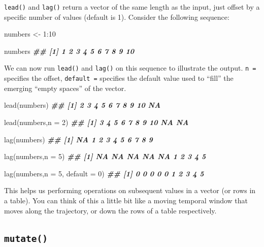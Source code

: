 \documentclass[
]{book}
\newenvironment{Shaded}{\begin{snugshade}}{\end{snugshade}}
\newcommand{\AttributeTok}[1]{\textcolor[rgb]{0.77,0.63,0.00}{#1}}
\newcommand{\DecValTok}[1]{\textcolor[rgb]{0.00,0.00,0.81}{#1}}
\newcommand{\DocumentationTok}[1]{\textcolor[rgb]{0.56,0.35,0.01}{\textbf{\textit{#1}}}}
\newcommand{\FunctionTok}[1]{\textcolor[rgb]{0.00,0.00,0.00}{#1}}
\newcommand{\NormalTok}[1]{#1}
\newcommand{\OtherTok}[1]{\textcolor[rgb]{0.56,0.35,0.01}{#1}}
\newcommand{\SpecialCharTok}[1]{\textcolor[rgb]{0.00,0.00,0.00}{#1}}
\begin{document}
\texttt{lead()} and \texttt{lag()} return a vector of the same length as the input, just offset by a specific number of values (default is 1). Consider the following sequence:

\begin{Shaded}
\begin{Highlighting}[]
\NormalTok{numbers }\OtherTok{\textless{}{-}} \DecValTok{1}\SpecialCharTok{:}\DecValTok{10}

\NormalTok{numbers}
\DocumentationTok{\#\#  [1]  1  2  3  4  5  6  7  8  9 10}
\end{Highlighting}
\end{Shaded}

We can now run \texttt{lead()} and \texttt{lag()} on this sequence to illustrate the output. \texttt{n\ =} specifies the offset, \texttt{default\ =} specifies the default value used to ``fill'' the emerging ``empty spaces'' of the vector.

\begin{Shaded}
\begin{Highlighting}[]
\FunctionTok{lead}\NormalTok{(numbers)}
\DocumentationTok{\#\#  [1]  2  3  4  5  6  7  8  9 10 NA}

\FunctionTok{lead}\NormalTok{(numbers,}\AttributeTok{n =} \DecValTok{2}\NormalTok{)}
\DocumentationTok{\#\#  [1]  3  4  5  6  7  8  9 10 NA NA}

\FunctionTok{lag}\NormalTok{(numbers)}
\DocumentationTok{\#\#  [1] NA  1  2  3  4  5  6  7  8  9}

\FunctionTok{lag}\NormalTok{(numbers,}\AttributeTok{n =} \DecValTok{5}\NormalTok{)}
\DocumentationTok{\#\#  [1] NA NA NA NA NA  1  2  3  4  5}

\FunctionTok{lag}\NormalTok{(numbers,}\AttributeTok{n =} \DecValTok{5}\NormalTok{, }\AttributeTok{default =} \DecValTok{0}\NormalTok{)}
\DocumentationTok{\#\#  [1] 0 0 0 0 0 1 2 3 4 5}
\end{Highlighting}
\end{Shaded}

This helps us performing operations on subsequent values in a vector (or rows in a table). You can think of this a little bit like a moving temporal window that moves along the trajectory, or down the rows of a table respectively.

\hypertarget{mutate}{%
\subsection{\texorpdfstring{\texttt{mutate()}}{mutate()}}\label{mutate}}
\end{document}
